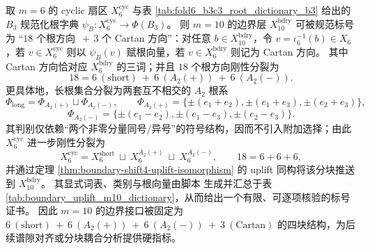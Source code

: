 \begin{theorem}\label{thm:boundary-m10-b3c3-rigid-four-block-split}
取 \(m=6\) 的 cyclic 扇区 \(X_6^{\mathrm{cyc}}\) 与表 \ref{tab:fold6_b3c3_root_dictionary_b3} 给出的 \(B_3\) 规范化根字典
\(\psi_B:X_6^{\mathrm{cyc}}\to\Phi(B_3)\)。
则 \(m=10\) 的边界层 \(X_{10}^{\mathrm{bdry}}\) 可被规范标号为 “\(18\) 个根方向 \(\,+\,3\) 个 Cartan 方向”：对任意 \(b\in X_{10}^{\mathrm{bdry}}\)，令 \(v=\iota_6^{-1}(b)\in X_6\)，若 \(v\in X_6^{\mathrm{cyc}}\) 则以 \(\psi_B(v)\) 赋根向量，若 \(v\in X_6^{\mathrm{bdry}}\) 则记为 Cartan 方向。
其中 Cartan 方向恰对应 \(X_6^{\mathrm{bdry}}\) 的三词；并且 \(18\) 个根方向刚性分裂为
\[
18=6\ (\mathrm{short})\ +\ 6\ (A_2(+))\ +\ 6\ (A_2(-)).
\]
更具体地，长根集合分裂为两套互不相交的 \(A_2\) 根系
\[
\Phi_{\mathrm{long}}=\Phi_{A_2(+)}\sqcup\Phi_{A_2(-)},\qquad
\Phi_{A_2(+)}=\{\pm(e_1+e_2),\pm(e_1+e_3),\pm(e_2+e_3)\},
\]
\[
\Phi_{A_2(-)}=\{\pm(e_1-e_2),\pm(e_1-e_3),\pm(e_2-e_3)\}.
\]
其判别仅依赖“两个非零分量同号/异号”的符号结构，因而不引入附加选择；由此 \(X_6^{\mathrm{cyc}}\) 进一步刚性分裂为
\[
X_6^{\mathrm{cyc}}=X_6^{\mathrm{short}}\ \sqcup\ X_6^{A_2(+)}\ \sqcup\ X_6^{A_2(-)},
\qquad 18=6+6+6,
\]
并通过定理 \ref{thm:boundary-shift4-uplift-isomorphism} 的 uplift 同构将该分块推送到 \(X_{10}^{\mathrm{bdry}}\)。
其显式词表、类别与根向量由脚本 \texttt{} 生成并汇总于表 \ref{tab:boundary_uplift_m10_dictionary}，从而给出一个有限、可逐项核验的标号证书。
因此 \(m=10\) 的边界接口被固定为
\(
6\ (\text{short})\ +\ 6\ (A_2(+))\ +\ 6\ (A_2(-))\ +\ 3\ (\text{Cartan})
\)
的四块结构，为后续谱隙对齐或分块耦合分析提供硬指标。
\end{theorem}


